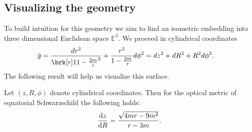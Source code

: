 \subsection{Visualizing the geometry}
To build intuition for this geometry we aim to find an isometric embedding into three dimensional Euclidean space $\mathbb{E}^3$. We proceed in cylindrical coordinates
\begin{align*}
\fermat &= \frac{dr^2}{\brk[r]1{1 - \frac{2m}{r}}^2} + \frac{r^2}{1 - \frac{2m}{r}} d\phi^2 = dz^2 + dR^2 + R^2 d\phi^2.
\end{align*}
The following result will help us visualize this surface.
%
\begin{proposition}[]\label{prop:derivatives-embed}
Let $(z, R, \phi)$ denote cylindrical coordinates. Then for the optical metric of equatorial Schwarzschild the following holds:
\begin{equation}\label{}
\diff{z}{R} = \frac{\sqrt{4mr-9m^2}}{r-3m}.
\end{equation}
\end{proposition}
%
